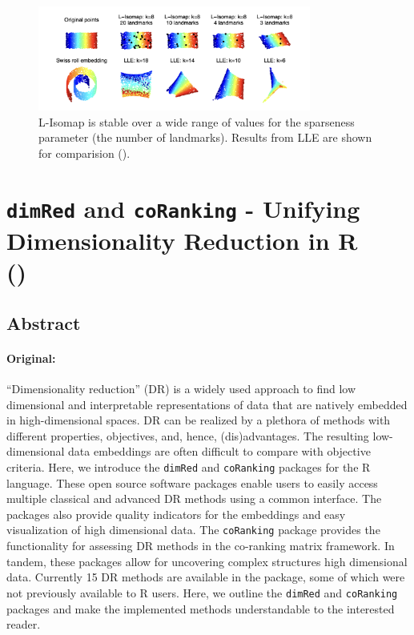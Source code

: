 \documentclass[a4paper,12pt]{article}
\begin{document}
\begin{figure}[ht]
    \centering
    \includegraphics[width=0.8\textwidth]{figures/LMDS_3.png}
    \caption{L-Isomap is stable over a wide range of values for the sparseness parameter (the number of landmarks). Results from LLE are shown for comparision (\cite{Silva2002}).}
    \label{fig:LMDS}
\end{figure}


\pagebreak
\section{\texttt{dimRed} and \texttt{coRanking} - Unifying Dimensionality Reduction in R \texorpdfstring{\\ (\cite{Kraemer2018})}{}}
\label{sec:Kraemer2018dimRedAC}

\subsection{Abstract}

\paragraph{Original:} “Dimensionality reduction” (DR) is a widely used approach to find low dimensional and interpretable representations of data that are natively embedded in high-dimensional spaces. DR can be realized by a plethora of methods with different properties, objectives, and, hence, (dis)advantages. The resulting low-dimensional data embeddings are often difficult to compare with objective criteria. Here, we introduce the \texttt{dimRed} and \texttt{coRanking} packages for the R language. These open source software packages enable users to easily access multiple classical and advanced DR methods using a common interface. The packages also provide quality indicators for the embeddings and easy visualization of high dimensional data. The \texttt{coRanking} package provides the functionality for assessing DR methods in the co-ranking matrix framework. In tandem, these packages allow for uncovering complex structures high dimensional data. Currently 15 DR methods are available in the package, some of which were not previously available to R users. Here, we outline the \texttt{dimRed} and \texttt{coRanking} packages and make the implemented methods understandable to the interested reader.
\end{document}
